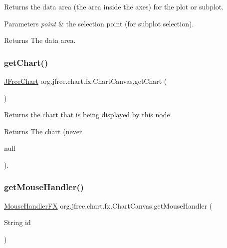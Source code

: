 Returns the data area (the area inside the axes) for the plot or subplot.


\begin{DoxyParams}{Parameters}
{\em point} & the selection point (for subplot selection).\\
\hline
\end{DoxyParams}
\begin{DoxyReturn}{Returns}
The data area. 
\end{DoxyReturn}
\mbox{\label{classorg_1_1jfree_1_1chart_1_1fx_1_1_chart_canvas_a65ae101a6345770ad9322c5cafe47881}} 
\subsubsection{\texorpdfstring{get\+Chart()}{getChart()}}
{\footnotesize\ttfamily \mbox{\hyperlink{classorg_1_1jfree_1_1chart_1_1_j_free_chart}{J\+Free\+Chart}} org.\+jfree.\+chart.\+fx.\+Chart\+Canvas.\+get\+Chart (\begin{DoxyParamCaption}{ }\end{DoxyParamCaption})}

Returns the chart that is being displayed by this node.

\begin{DoxyReturn}{Returns}
The chart (never
\begin{DoxyCode}
null 
\end{DoxyCode}
 ). 
\end{DoxyReturn}
\mbox{\label{classorg_1_1jfree_1_1chart_1_1fx_1_1_chart_canvas_a33d9ead3f1750b2d4499c661950084cb}} 
\subsubsection{\texorpdfstring{get\+Mouse\+Handler()}{getMouseHandler()}}
{\footnotesize\ttfamily \mbox{\hyperlink{interfaceorg_1_1jfree_1_1chart_1_1fx_1_1interaction_1_1_mouse_handler_f_x}{Mouse\+Handler\+FX}} org.\+jfree.\+chart.\+fx.\+Chart\+Canvas.\+get\+Mouse\+Handler (\begin{DoxyParamCaption}\item[{String}]{id }\end{DoxyParamCaption})}

